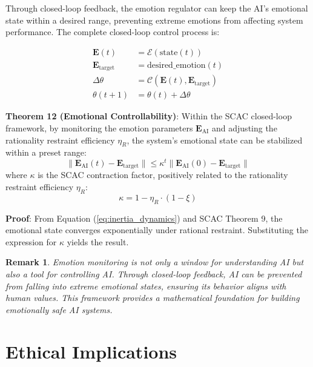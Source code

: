 \documentclass[12pt,a4paper]{article}
\theoremstyle{plain}
\newtheorem{remark}{Remark}[section]
\newcommand{\ve}[1]{\bm{#1}}                    %
\newcommand{\Evec}{\ve{E}}                        %
\begin{document}
Through closed-loop feedback, the emotion regulator can keep the AI's emotional state within a desired range, preventing extreme emotions from affecting system performance. The complete closed-loop control process is:

\begin{equation}
\begin{aligned}
\Evec(t) &= \mathcal{E}(\text{state}(t)) \\
\Evec_{\text{target}} &= \text{desired\_emotion}(t) \\
\Delta \theta &= \mathcal{C}(\Evec(t), \Evec_{\text{target}}) \\
\theta(t+1) &= \theta(t) + \Delta \theta
\end{aligned}
\label{eq:closed_loop}
\end{equation}

\textbf{Theorem 12 (Emotional Controllability)}: Within the SCAC closed-loop framework, by monitoring the emotion parameters $\Evec_{\text{AI}}$ and adjusting the rationality restraint efficiency $\eta_R$, the system's emotional state can be stabilized within a preset range:
\begin{equation}
\|\Evec_{\text{AI}}(t) - \Evec_{\text{target}}\| \leq \kappa^t \|\Evec_{\text{AI}}(0) - \Evec_{\text{target}}\|
\label{eq:controllability}
\end{equation}
where $\kappa$ is the SCAC contraction factor, positively related to the rationality restraint efficiency $\eta_R$:
\begin{equation}
\kappa = 1 - \eta_R \cdot (1 - \xi)
\label{eq:kappa_relation}
\end{equation}

\textbf{Proof}: From Equation (\ref{eq:inertia_dynamics}) and SCAC Theorem 9, the emotional state converges exponentially under rational restraint. Substituting the expression for $\kappa$ yields the result.

\begin{remark}
Emotion monitoring is not only a window for understanding AI but also a tool for controlling AI. Through closed-loop feedback, AI can be prevented from falling into extreme emotional states, ensuring its behavior aligns with human values. This framework provides a mathematical foundation for building emotionally safe AI systems.
\end{remark}

\section{Ethical Implications}
\end{document}
